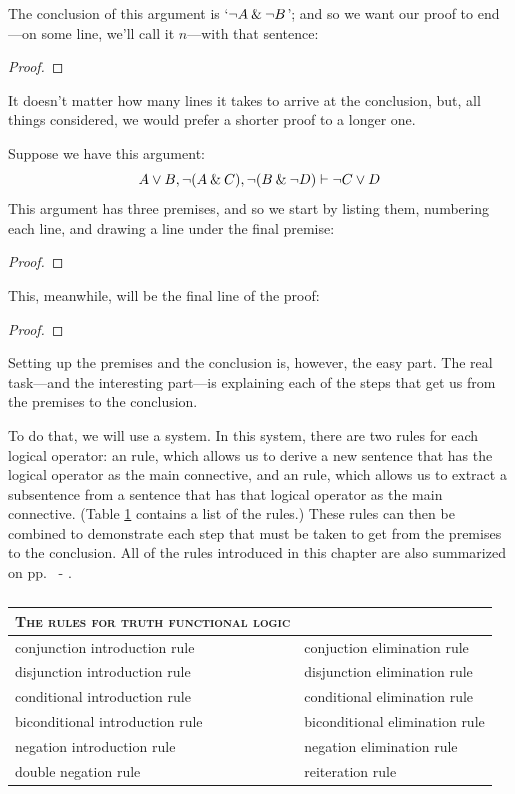 The conclusion of this argument is `${\neg} A \mathbin{\&} {\neg} B$'; and so we want our proof to end---on some line, we'll call it $n$---with that sentence:
\begin{proof}
	 \pr{}
	\have[ ]{}{\ldots}
	\have[ ]{}{\ldots}
\end{proof}
It doesn't matter how many lines it takes to arrive at the conclusion, but, all things considered, we would prefer a shorter proof to a longer one.

Suppose we have this argument:
$$A\vee B, {\neg} (A\mathbin{\&} C), {\neg} (B \mathbin{\&} {\neg} D) \vdash {\neg} C\vee D$$
This argument has three premises, and so we start by listing them, numbering each line, and drawing a line under the final premise:
\begin{proof}
	 \pr{}
	 \pr{}
	 \pr{}
\end{proof}
This, meanwhile, will be the final line of the proof:
\begin{proof}
\end{proof}
Setting up the premises and the conclusion is, however, the easy part. The real task---and the interesting part---is explaining each of the steps that get us from the premises to the conclusion. 

To do that, we will use a  system. In this system, there are two rules for each logical operator: an  rule, which allows us to derive a new sentence that has the logical operator as the main connective, and an  rule, which allows us to extract a subsentence from a sentence that has that logical operator as the main connective. (Table \ref{table.TFL-rules} contains a list of the rules.) These rules can then be combined to demonstrate each step that must be taken to get from the premises to the conclusion. All of the rules introduced in this chapter are also summarized on pp.~\pageref{ProofRules} - \pageref{ProofRules-end}.


\begin{table}\centering\sffamily\footnotesize
{}
\begin{tabular}{@{}l l@{}}\toprule
\textsc{The rules for truth functional logic} & \\\midrule
conjunction introduction rule & conjuction elimination rule \\
disjunction introduction rule & disjunction elimination rule \\
conditional introduction rule & conditional elimination rule \\
biconditional introduction rule & biconditional elimination rule \\
negation introduction rule & negation elimination rule \\
double negation rule & reiteration rule\\
\bottomrule
\end{tabular}
\caption{}\label{table.TFL-rules}
\end{table}



